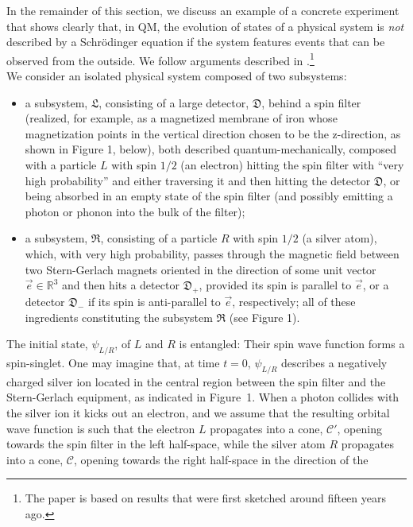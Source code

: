 \documentclass[12pt]{article}
\begin{document}
In the remainder of this section, we discuss an example of a concrete experiment that shows clearly that, in QM, the evolution
of states of a physical system is \textit{not} described by a Schr\"odinger equation if the system features events that can be
observed from the outside. We follow arguments described in
\cite{FFS, Schill}.\footnote{The paper \cite{FFS} is based on results that were first sketched around fifteen years ago.} \\

We consider an isolated physical system composed of two subsystems:
\begin{itemize}
\item{a subsystem, $\mathfrak{L}$, consisting of a large detector, $\mathfrak{D}$, behind a spin filter (realized, for example,
as a magnetized membrane of iron whose magnetization points in the vertical direction
chosen to be the z-direction, as shown in {Figure 1}, below), both described quantum-mechanically, composed with a
particle $L$ with spin $1/2$ (an electron) hitting the spin filter with ``very high probability'' and either traversing
it and then hitting the detector $\mathfrak{D}$, or being absorbed in an empty state of the spin filter
(and possibly emitting a photon or phonon into the bulk of the filter);}
\item{a subsystem, $\mathfrak{R}$, consisting of a particle $R$ with spin $1/2$ (a silver atom),
which, with very high probability, passes through the magnetic field between two Stern-Gerlach magnets oriented
in the direction of some unit vector $\vec{e} \in \mathbb{R}^{3}$ and then hits a detector $\mathfrak{D}_{+}$, provided
 its spin is parallel to $\vec{e}$, or a detector $\mathfrak{D}_{-}$ if its spin is anti-parallel to $\vec{e}$,
 respectively; all of these ingredients constituting the subsystem $\mathfrak{R}$ (see {Figure 1}).}
\end{itemize}
The initial state, $\psi_{L/R}$, of $L$ and $R$ is entangled: Their spin wave function forms
a spin-singlet. One may imagine that, at time $t=0$, $\psi_{L/R}$ describes a negatively charged silver ion
located in the central region between the spin filter and the Stern-Gerlach equipment, as indicated in \mbox{{Figure 1}.}
When a photon collides with the silver ion it kicks out an electron, and we assume that the resulting orbital wave function
is such that the electron $L$ propagates into a cone, $\mathcal{C}'$, opening towards the spin filter in the left half-space,
while the silver atom $R$ propagates into a cone, $\mathcal{C}$, opening towards the right half-space in the direction of the
\end{document}
